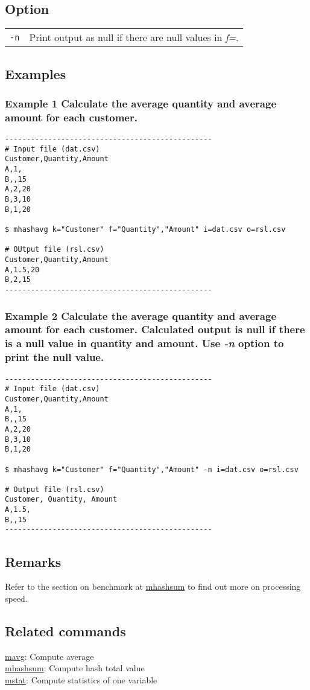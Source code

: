 \documentclass[a4paper]{jarticle}
\begin{document}
\subsection*{Option}
\begin{table}[htbp]
{\small
\begin{tabular}{ll}
\verb|-n|    & Print output as null if there are null values in \emph{f=}. \\
\end{tabular} 
}
\end{table} 

\subsection*{Examples}
\subsubsection*{Example 1 Calculate the average quantity and average amount for each customer.}

\begin{verbatim}
------------------------------------------------
# Input file (dat.csv)
Customer,Quantity,Amount
A,1,
B,,15
A,2,20
B,3,10
B,1,20

$ mhashavg k="Customer" f="Quantity","Amount" i=dat.csv o=rsl.csv

# OUtput file (rsl.csv)
Customer,Quantity,Amount
A,1.5,20
B,2,15
------------------------------------------------
\end{verbatim}

\subsubsection*{Example 2 Calculate the average quantity and average amount for each customer. Calculated output is null if there is a null value in quantity and amount. Use \emph{-n} option to print the null value. 
}
\begin{verbatim}
------------------------------------------------
# Input file (dat.csv)
Customer,Quantity,Amount
A,1,
B,,15
A,2,20
B,3,10
B,1,20

$ mhashavg k="Customer" f="Quantity","Amount" -n i=dat.csv o=rsl.csv

# Output file (rsl.csv)
Customer, Quantity, Amount
A,1.5,
B,,15
------------------------------------------------
\end{verbatim}

\subsection*{Remarks}
Refer to the section on benchmark at \href{run mhashsum.pdf} {mhashsum} to find out more on processing speed. 

\subsection*{Related commands}
\noindent
\href{run:mavg.pdf}{mavg}: Compute average \\
\href{run:mhashsum.pdf}{mhashsum}: Compute hash total value  \\
\href{run:mstat.pdf}{mstat}: Compute statistics of one variable\\
\end{document}
